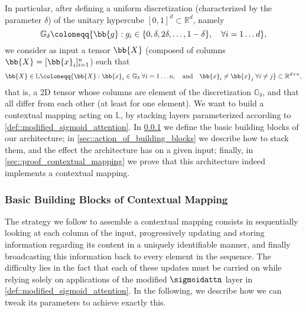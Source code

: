 In particular, after defining a uniform discretization (characterized by the parameter $\delta$) of the unitary hypercube $[0,1]^{d}\subset\mathbb{R}^{d}$, namely
\begin{equation}
    \mathbb{G}_\delta \coloneqq \{\bb{g}:g_i\in\{0,\delta,2\delta,\dots,1-\delta\}, \quad\forall i=1\dots d\},
\end{equation}
we consider as input a tensor $\bb{X}$ (composed of columns $\bb{X}=[\bb{x}_{i}]_{i=1}^{n}$) such that
\begin{equation}
    \bb{X}\in\mathbb{L}\coloneqq\{\bb{X}: \bb{x}_{i}\in\mathbb{G}_\delta\;\forall i=1\dots n,\quad\text{and}\quad \bb{x}_{i}\neq\bb{x}_{j}\;\forall i\neq j\}\subset\mathbb{R}^{d\times n},
    \label{eqn::quantised_input}
\end{equation}
that is, a 2D tensor whose columns are element of the discretization $\mathbb{G}_\delta$, and that all differ from each other (at least for one element).
We want to build a contextual mapping acting on $\mathbb{L}$, by stacking layers parameterized according to \cref{def::modified_sigmoid_attention}. In \cref{sec::building_blocks} we define the basic building blocks of our architecture; in \cref{sec::action_of_building_blocks} we describe how to stack them, and the effect the architecture has on a given input; finally, in \cref{sec::proof_contextual_mapping} we prove that this architecture indeed implements a contextual mapping.


\subsubsection{Basic Building Blocks of Contextual Mapping}
\label{sec::building_blocks}
The strategy we follow to assemble a contextual mapping consists in sequentially looking at each column of the input, progressively updating and storing information regarding its content in a uniquely identifiable manner, and finally broadcasting this information back to every element in the sequence. The difficulty lies in the fact that each of these updates must be carried on while relying solely on applications of the modified $\sigmoidattn$ layer in \cref{def::modified_sigmoid_attention}. In the following, we describe how we can tweak its parameters to achieve exactly this.

